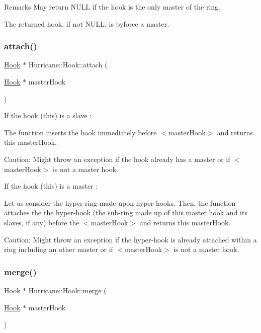 \begin{DoxyRemark}{Remarks}
May return N\+U\+LL if the hook is the only master of the ring.
\end{DoxyRemark}
The returned hook, if not N\+U\+LL, is byforce a master. \mbox{\label{classHurricane_1_1Hook_aacc4dacd0d128b35fd15546bc6dde3c3}} 
\subsubsection{\texorpdfstring{attach()}{attach()}}
{\footnotesize\ttfamily \mbox{\hyperlink{classHurricane_1_1Hook}{Hook}} $\ast$ Hurricane\+::\+Hook\+::attach (\begin{DoxyParamCaption}\item[{\mbox{\hyperlink{classHurricane_1_1Hook}{Hook}} $\ast$}]{master\+Hook }\end{DoxyParamCaption})}

If the hook (this) is a slave \+:

The function inserts the hook immediately before {\ttfamily $<$master\+Hook$>$} and returns this master\+Hook.

\begin{DoxyParagraph}{Caution\+: Might throw an exception if the hook already has a master or }
if {\ttfamily $<$master\+Hook$>$} is not a master hook.
\end{DoxyParagraph}
If the hook (this) is a master \+:

Let us consider the hyper-\/ring made upon hyper-\/hooks. Then, the function attaches the the hyper-\/hook (the sub-\/ring made up of this master hook and its slaves, if any) before the {\ttfamily $<$master\+Hook$>$} and returns this master\+Hook.

\begin{DoxyParagraph}{Caution\+: Might throw an exception if the hyper-\/hook is already }
attached within a ring including an other master or if {\ttfamily $<$master\+Hook$>$} is not a master hook. 
\end{DoxyParagraph}
\mbox{\label{classHurricane_1_1Hook_a7b98f0796a9080495472d574a23bcca0}} 
\subsubsection{\texorpdfstring{merge()}{merge()}}
{\footnotesize\ttfamily \mbox{\hyperlink{classHurricane_1_1Hook}{Hook}} $\ast$ Hurricane\+::\+Hook\+::merge (\begin{DoxyParamCaption}\item[{\mbox{\hyperlink{classHurricane_1_1Hook}{Hook}} $\ast$}]{master\+Hook }\end{DoxyParamCaption})}

